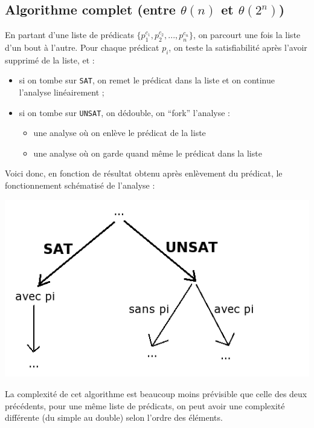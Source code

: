 \documentclass[french]{article}
\newcommand\SAT{\texttt{SAT}}
\newcommand\UNSAT{\texttt{UNSAT}}
\begin{document}
  \subsection{Algorithme complet (entre $\theta(n)$ et $\theta(2^n)$)}
  En partant d’une liste de prédicats $\{p_1^{c_1}, p_2^{c_2}, ..., p_n^{c_n}\}$, on parcourt une fois la liste d’un bout à l’autre. Pour chaque prédicat $p_i$, on teste la satisfiabilité après l’avoir supprimé de la liste, et :
  \begin{itemize}
    \item si on tombe sur \SAT, on remet le prédicat dans la liste et on continue l’analyse linéairement ;
    \item si on tombe sur \UNSAT, on dédouble, on ``fork'' l’analyse :
    \begin{itemize}
      \item une analyse où on enlève le prédicat de la liste
      \item une analyse où on garde quand même le prédicat dans la liste
    \end{itemize}
  \end{itemize}
  
  Voici donc, en fonction de résultat obtenu après enlèvement du prédicat, le fonctionnement schématisé de l'analyse :
  
  \begin{center}
    \includegraphics[scale=0.7]{./pictures/alg3.png}
  \end{center}
  
  La complexité de cet algorithme est beaucoup moins prévisible que celle des deux précédents, pour une même liste de prédicats, on peut avoir une complexité différente (du simple au double) selon l'ordre des éléments.
  
\end{document}
